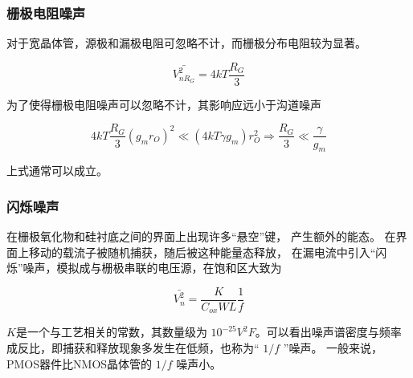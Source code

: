 \documentclass[cn,11pt,chinese,black,simple]{../elegantbook}
\begin{document}
\subsubsection{栅极电阻噪声}

对于宽晶体管，源极和漏极电阻可忽略不计，而栅极分布电阻较为显著。

\[\bar{V^2_{nR_G}} = 4 k T \dfrac{R_G}{3}\]



为了使得栅极电阻噪声可以忽略不计，其影响应远小于沟道噪声

\[4 k T \frac{R_{G}}{3}\left(g_{m} r_{O}\right)^{2} \ll\left(4 k T \gamma g_{m}\right) r_{O}^{2} \Rightarrow \frac{R_{G}}{3} \ll \frac{\gamma}{g_{m}}\]

上式通常可以成立。

\subsubsection{闪烁噪声}

在栅极氧化物和硅衬底之间的界面上出现许多“悬空”键，
产生额外的能态。
在界面上移动的载流子被随机捕获，随后被这种能量态释放，
在漏电流中引入“闪烁”噪声，模拟成与栅极串联的电压源，在饱和区大致为

\[\bar{V_n^2} = \dfrac{K}{C_{ox} WL} \dfrac{1}{f}\]

\(K\)是一个与工艺相关的常数，其数量级为 \(10^{-25} V^{2} F\)。可以看出噪声谱密度与频率成反比，即捕获和释放现象多发生在低频，也称为“ \(1/f\) ”噪声。 一般来说，PMOS器件比NMOS晶体管的 \(1/f\) 噪声小。




\ifx\mainclass\undefined
\end{document}
